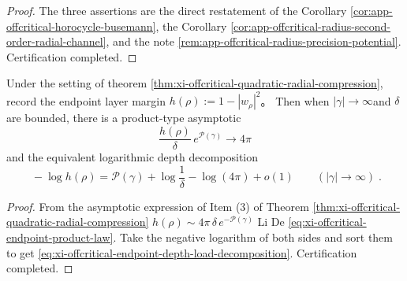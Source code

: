 \begin{proof}
The three assertions are the direct restatement of the Corollary \ref{cor:app-offcritical-horocycle-busemann}, the Corollary \ref{cor:app-offcritical-radius-second-order-radial-channel}, and the note \ref{rem:app-offcritical-radius-precision-potential}. Certification completed.
\end{proof}

\begin{corollary}\label{cor:xi-offcritical-endpoint-depth-log-decomposition}
Under the setting of theorem \ref{thm:xi-offcritical-quadratic-radial-compression}, record the endpoint layer margin
\(
h(\rho):=1-|w_\rho|^2
\)。
Then when \(|\gamma|\to\infty\) ​​and \(\delta\) are bounded, there is a product-type asymptotic
\begin{equation}\label{eq:xi-offcritical-endpoint-product-law}
\boxed{\;
\frac{h(\rho)}{\delta}\,e^{\mathcal{P}(\gamma)}\to 4\pi\;}
\end{equation}
and the equivalent logarithmic depth decomposition
\begin{equation}\label{eq:xi-offcritical-endpoint-depth-load-decomposition}
\boxed{\;
-\log h(\rho)=\mathcal{P}(\gamma)+\log\frac{1}{\delta}-\log(4\pi)+o(1)\qquad(|\gamma|\to\infty)\; }.
\end{equation}
\end{corollary}

\begin{proof}
From the asymptotic expression of Item (3) of Theorem \ref{thm:xi-offcritical-quadratic-radial-compression}
\(
h(\rho)\sim 4\pi\,\delta\,e^{-\mathcal{P}(\gamma)}
\)
Li De \eqref{eq:xi-offcritical-endpoint-product-law}.
Take the negative logarithm of both sides and sort them to get \eqref{eq:xi-offcritical-endpoint-depth-load-decomposition}. Certification completed.
\end{proof}

